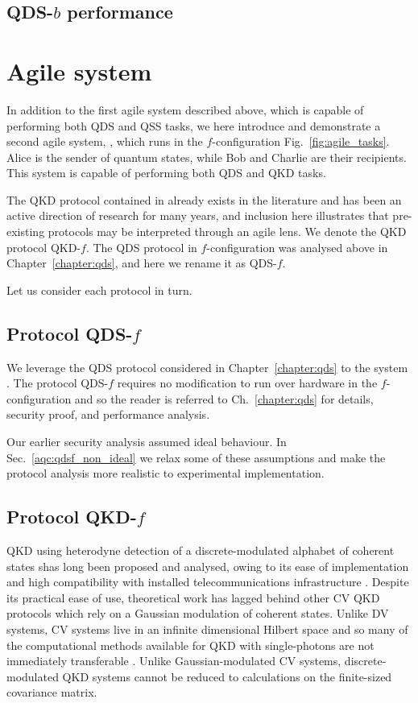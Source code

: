 \subsection{QDS-$b$ performance}

\section{Agile system \systemF}

In addition to the first agile system described above, which is capable of performing both QDS and QSS tasks, we here introduce and demonstrate a second agile system, \systemF, which runs in the $f$-configuration Fig.~\ref{fig:agile_tasks}. Alice is the sender of quantum states, while Bob and Charlie are their recipients. This system is capable of performing both QDS and QKD tasks.

The QKD protocol contained in \systemF  already exists in the literature \cite{Leverrier2011a, Papanastasiou2018} and has been an active direction of research for many years, and inclusion here illustrates that pre-existing protocols may be interpreted through an agile lens. We denote the QKD protocol QKD-$f$. The QDS protocol in $f$-configuration was analysed above in Chapter~\ref{chapter:qds}, and here we rename it as QDS-$f$.

Let us consider each protocol in turn.

\subsection{Protocol QDS-$f$}
We leverage the QDS protocol considered in Chapter~\ref{chapter:qds} to the system \systemF. The protocol QDS-$f$ requires no modification to run over hardware in the $f$-configuration and so the reader is referred to Ch.~\ref{chapter:qds} for details, security proof, and performance analysis.

Our earlier security analysis assumed ideal behaviour. In Sec.~\ref{aqc:qdsf_non_ideal} we relax some of these assumptions and make the protocol analysis more realistic to experimental implementation.


\subsection{Protocol QKD-$f$}
QKD using heterodyne detection of a discrete-modulated alphabet of coherent states shas long been proposed and analysed, owing to its ease of implementation and high compatibility with installed telecommunications infrastructure \cite{Leverrier2011a, Papanastasiou2018, Zhao2009, Bradler2017, Ghorai2019, Lin2019}.%
Despite its practical ease of use, theoretical work has lagged behind other CV QKD protocols which rely on a Gaussian modulation of coherent states. Unlike DV systems, CV systems live in an infinite dimensional Hilbert space and so many of the computational methods available for QKD with single-photons are not immediately transferable \cite{Tomamichel2012}. Unlike Gaussian-modulated CV systems, discrete-modulated QKD systems cannot be reduced to calculations on the finite-sized covariance matrix. 

